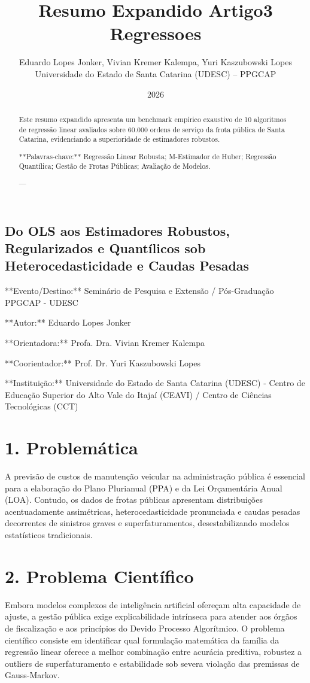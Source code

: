 \documentclass[10pt,a4paper,journal]{article}
\title{Resumo Expandido Artigo3 Regressoes}
\author{Eduardo Lopes Jonker, Vivian Kremer Kalempa, Yuri Kaszubowski Lopes\\ \small Universidade do Estado de Santa Catarina (UDESC) -- PPGCAP}
\date{2026}
\begin{document}
\maketitle

\subsection{Do OLS aos Estimadores Robustos, Regularizados e Quantílicos sob Heterocedasticidade e Caudas Pesadas}
**Evento/Destino:** Seminário de Pesquisa e Extensão / Pós-Graduação PPGCAP - UDESC

**Autor:** Eduardo Lopes Jonker

**Orientadora:** Profa. Dra. Vivian Kremer Kalempa

**Coorientador:** Prof. Dr. Yuri Kaszubowski Lopes

**Instituição:** Universidade do Estado de Santa Catarina (UDESC) - Centro de Educação Superior do Alto Vale do Itajaí (CEAVI) / Centro de Ciências Tecnológicas (CCT)

\begin{abstract}
Este resumo expandido apresenta um benchmark empírico exaustivo de 10 algoritmos de regressão linear avaliados sobre 60.000 ordens de serviço da frota pública de Santa Catarina, evidenciando a superioridade de estimadores robustos.

**Palavras-chave:** Regressão Linear Robusta; M-Estimador de Huber; Regressão Quantílica; Gestão de Frotas Públicas; Avaliação de Modelos.

---

\end{abstract}

\section{1. Problemática}
A previsão de custos de manutenção veicular na administração pública é essencial para a elaboração do Plano Plurianual (PPA) e da Lei Orçamentária Anual (LOA). Contudo, os dados de frotas públicas apresentam distribuições acentuadamente assimétricas, heterocedasticidade pronunciada e caudas pesadas decorrentes de sinistros graves e superfaturamentos, desestabilizando modelos estatísticos tradicionais.

\section{2. Problema Científico}
Embora modelos complexos de inteligência artificial ofereçam alta capacidade de ajuste, a gestão pública exige explicabilidade intrínseca para atender aos órgãos de fiscalização e aos princípios do Devido Processo Algorítmico. O problema científico consiste em identificar qual formulação matemática da família da regressão linear oferece a melhor combinação entre acurácia preditiva, robustez a outliers de superfaturamento e estabilidade sob severa violação das premissas de Gauss-Markov.
\end{document}
